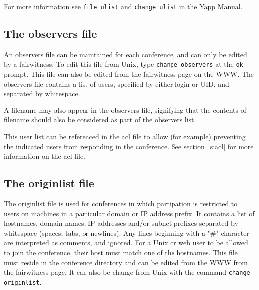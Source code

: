 \documentclass[twoside]{report}
\begin{document}
         For more information see {\tt file ulist} and {\tt change ulist} in 
         the Yapp Manual.


      \subsection{The observers file} \label{s:observers}

         An observers file  can be maintained for 
         each conference, and can only be edited by a fairwitness.
         To edit this file from Unix, type {\tt change observers}
         at the {\tt ok} prompt.  This file can also be edited from the
         fairwitness page on the WWW.  The observers file contains a list 
         of users, specified by either login or UID, and separated by 
         whitespace.  

         A filename may also appear in the observers file, signifying that the
         contents of filename should also be considered as part of the
         observers list. 

         This user list can be referenced in the acl file to allow (for example)
         preventing the indicated users from responding in the conference.
         See section~\ref{s:acl} for more information on the acl file.


      \subsection{The originlist file} \label{s:origin}

        The originlist file is used for conferences 
        in which partipation is restricted to users on machines in a 
        particular domain or IP address prefix.  It contains a list 
        of hostnames, domain names, IP addresses and/or subnet prefixes 
        separated by whitespace (spaces, tabs, or newlines).  Any lines 
        beginning with a "\#" character are interpreted as comments, and 
        ignored.  For a Unix or web user to be allowed to join the 
        conference, their host must match one of the hostnames.  This file 
        must reside in the conference directory and can be edited from 
        the WWW from the fairwitness page.  It can also be change
        from Unix with the command {\tt change originlist}.
\end{document}
